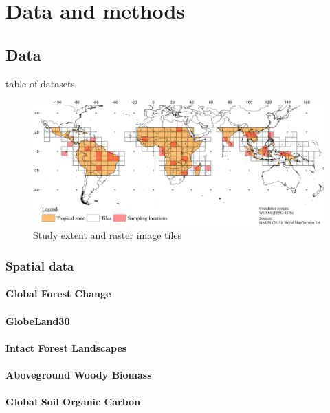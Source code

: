 \section{Data and methods}
\label{sec:datamethods}

\subsection{Data}
\label{subsec:data}

	{\color{red} table of datasets} 

	\begin{figure}[h]
		\centering
		\includegraphics[scale=.97]{img/method_overview_frameless}
		\caption[Study extent]{Study extent and raster image tiles}
		\label{fig:studyextent}
	\end{figure}

	\subsubsection{Spatial data}
		\paragraph{Global Forest Change}
		\paragraph{GlobeLand30}
		\paragraph{Intact Forest Landscapes}
		\paragraph{Aboveground Woody Biomass}
		\paragraph{Global Soil Organic Carbon}
